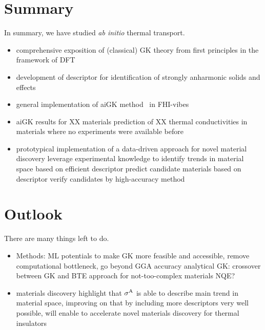 \section{Summary}

In summary, we have studied \emph{ab initio} thermal transport.

\begin{itemize}
	\item comprehensive exposition of (classical) GK theory from first principles in the framework of DFT
	\item development of descriptor for identification of strongly anharmonic solids and effects~\cite{Knoop2020}
	\item general implementation of aiGK method~\cite{Carbogno2016} in FHI-vibes~\cite{FHI-vibes}
	\item aiGK results for XX materials
		\subitem prediction of XX thermal conductivities in materials where no experiments were available before
	\item prototypical implementation of a data-driven approach for novel material discovery
		\subitem leverage experimental knowledge to identify trends in material space based on efficient descriptor
		\subitem predict candidate materials based on descriptor
		\subitem verify candidates by high-accuracy method
\end{itemize}

\section{Outlook}

There are many things left to do.

\begin{itemize}
	\item Methods:
		\subitem ML potentials to make GK more feasible and accessible, remove computational bottleneck, go beyond GGA accuracy  
		\subitem analytical GK: crossover between GK and BTE approach for not-too-complex materials
			\subsubitem NQE? \cite{shulumba2017,sutherland2021}
	\item materials discovery
		\subitem highlight that $\sigma^\mathrm{A}$ is able to describe main trend in material space, improving on that by including more descriptors very well possible, will enable to accelerate novel materials discovery for thermal insulators
\end{itemize}